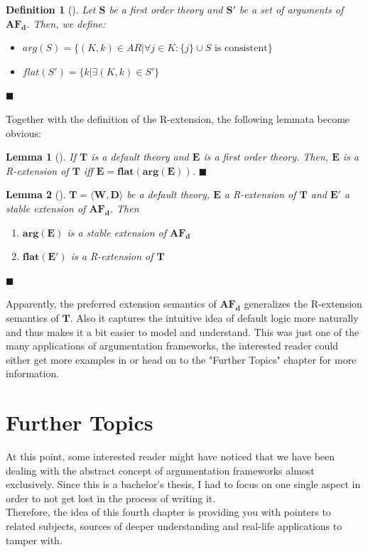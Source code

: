 \documentclass[12pt]{report}
\numberwithin{figure}{chapter}
\theoremstyle{break}
\newtheorem{defn}{Definition}[chapter]
\newtheorem{lem}{Lemma}[chapter]
\newenvironment{mydefn}{\begin{defn}}{$\blacksquare$ \end{defn}}
\newenvironment{mylem}{\begin{lem}}{$\blacksquare$ \end{lem}}
\begin{document}
\begin{mydefn}[\cite{Dung}]
Let $\bm{S}$ be a first order theory and $\bm{S'}$ be a set of arguments of $\bm{AF_{d}}$. Then, we define:\\
\begin{itemize}
	\item{$arg(S) = \{(K,k) \in AR \vert \forall j \in K: \{j\} \cup S \text{ is consistent}\}$}
	\item{$flat(S') = \{k \vert \exists(K,k) \in S'\}$}
\end{itemize}
\end{mydefn}

Together with the definition of the R-extension, the following lemmata become obvious:\\
\begin{mylem}[\cite{Dung}]
If $\bm{T}$ is a default theory and $\bm{E}$ is a first order theory. Then, $\bm{E}$ is a R-extension of $\bm{T}$ iff $\bm{E = flat(arg(E))}$.
\end{mylem}

\begin{mylem}[\cite{Dung}]
$\bm{T = \langle W,D \rangle}$ be a default theory, $\bm{E}$ a R-extension of $\bm{T}$ and $\bm{E'}$ a stable extension of $\bm{AF_{d}}$.
Then \\
\begin{enumerate}
	\item{$\bm{arg(E)}$ is a stable extension of $\bm{AF_{d}}$}
	\item{$\bm{flat(E')}$ is a R-extension of $\bm{T}$}
\end{enumerate}
\end{mylem}

Apparently, the preferred extension semantics of $\bm{AF_{d}}$ generalizes the R-extension semantics of $\bm{T}$.
Also it captures the intuitive idea of default logic more naturally and thus makes it a bit easier to model and understand.
This was just one of the many applications of argumentation frameworks, the interested reader could either get more examples in \cite{Dung} or
head on to the "Further Topics" chapter for more information.

\chapter{Further Topics}
At this point, some interested reader might have noticed that we have been dealing with the abstract concept of argumentation frameworks almost exclusively.
Since this is a bachelor's thesis, I had to focus on one single aspect in order to not get lost in the process of writing it.\\
Therefore, the idea of this fourth chapter is providing you with pointers to related subjects, sources of deeper understanding and real-life applications to tamper with.
\end{document}

